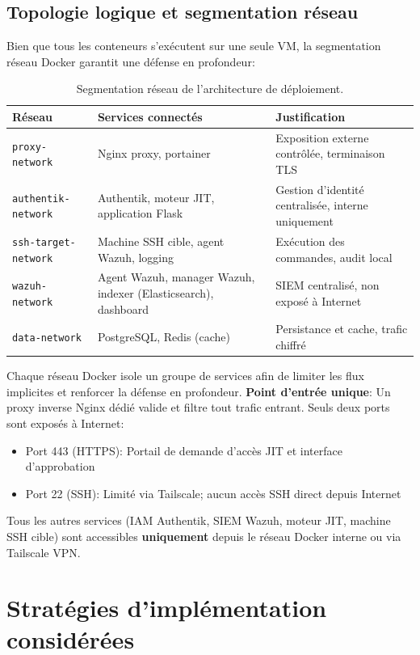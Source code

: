 \subsection{Topologie logique et segmentation réseau}

Bien que tous les conteneurs s'exécutent sur une seule VM, la segmentation réseau Docker garantit une défense en profondeur:

\begin{table}[h]
\centering
\begin{tabularx}{\textwidth}{|l|p{7cm}|p{4cm}|}
\hline
\textbf{Réseau} & \textbf{Services connectés} & \textbf{Justification} \\
\hline
\texttt{proxy-network} & Nginx proxy, portainer & Exposition externe contrôlée, terminaison TLS \\
\hline
\texttt{authentik-network} & Authentik, moteur JIT, application Flask & Gestion d'identité centralisée, interne uniquement \\
\hline
\texttt{ssh-target-network} & Machine SSH cible, agent Wazuh, logging & Exécution des commandes, audit local \\
\hline
\texttt{wazuh-network} & Agent Wazuh, manager Wazuh, indexer (Elasticsearch), dashboard & SIEM centralisé, non exposé à Internet \\
\hline
\texttt{data-network} & PostgreSQL, Redis (cache) & Persistance et cache, trafic chiffré \\
\hline
\end{tabularx}
\caption{Segmentation réseau de l'architecture de déploiement. }
\end{table}
Chaque réseau Docker isole un groupe de services afin de limiter les flux implicites et renforcer la défense en profondeur.
\textbf{Point d'entrée unique}: Un proxy inverse Nginx dédié valide et filtre tout trafic entrant. Seuls deux ports sont exposés à Internet:
\begin{itemize}
	\item Port 443 (HTTPS): Portail de demande d'accès JIT et interface d'approbation
	\item Port 22 (SSH): Limité via Tailscale; aucun accès SSH direct depuis Internet
\end{itemize}

Tous les autres services (IAM Authentik, SIEM Wazuh, moteur JIT, machine SSH cible) sont accessibles \textbf{uniquement} depuis le réseau Docker interne ou via Tailscale VPN.

\section{Stratégies d'implémentation considérées}


